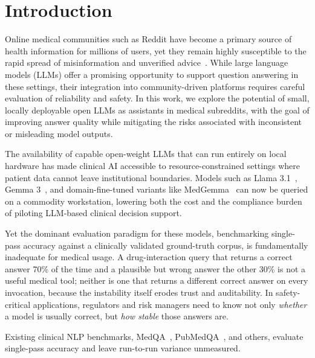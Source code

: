 \documentclass[10pt,letterpaper]{article}
\begin{document}
\linenumbers

\section*{Introduction}

Online medical communities such as Reddit have become a primary
source of health information for millions of users, yet they remain
highly susceptible to the rapid spread of misinformation and unverified
advice~\cite{suarezlledo2021misinfo, sager2021reddit}.
While large language models (LLMs) offer a promising opportunity to support
question answering in these settings, their integration into
community-driven platforms requires careful evaluation of reliability
and safety. In this work, we explore the potential of small,
locally deployable open LLMs as assistants in medical subreddits,
with the goal of improving answer quality while mitigating the
risks associated with inconsistent or misleading model outputs.

The availability of capable open-weight LLMs that can run entirely
on local hardware has made clinical AI accessible to resource-constrained
settings where patient data cannot leave institutional boundaries.
Models such as Llama 3.1~\cite{dubey2024llama3},
Gemma 3~\cite{team2024gemma}, and domain-fine-tuned variants like
MedGemma~\cite{medgemma2024} can now be queried on a commodity
workstation, lowering both the cost and the compliance burden of
piloting LLM-based clinical decision support.

Yet the dominant evaluation paradigm for these models, benchmarking
single-pass accuracy against a clinically validated ground-truth corpus,
is fundamentally inadequate for medical usage.
A drug-interaction query that returns a correct answer 70\% of the time
and a plausible but wrong answer the other 30\% is not a useful medical
tool; neither is one that returns a different correct answer on every
invocation, because the instability itself erodes trust and
auditability.
In safety-critical applications, regulators and risk managers need to
know not only \emph{whether} a model is usually correct, but
\emph{how stable} those answers are.

Existing clinical NLP benchmarks, MedQA~\cite{jin2021disease},
PubMedQA~\cite{jin2019pubmedqa}, and others, evaluate single-pass
accuracy and leave run-to-run variance unmeasured.
\end{document}
